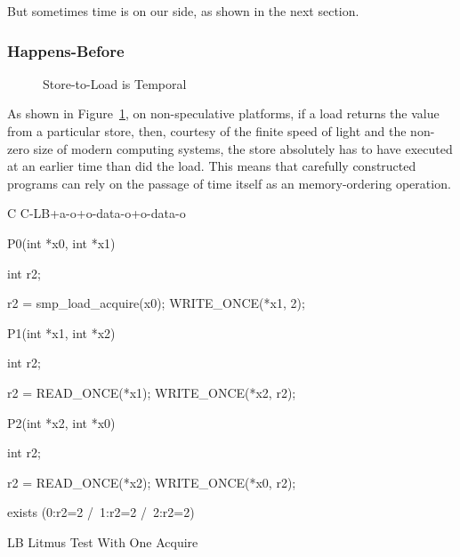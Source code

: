 But sometimes time is on our side, as shown in the next section.

\subsubsection{Happens-Before}
\label{sec:memorder:Happens-Before}

\begin{figure}[tbp]
\centering
{}
\caption{Store-to-Load is Temporal}
\label{fig:memorder:Store-to-Load is Temporal}
\end{figure}

As shown in
Figure~\ref{fig:memorder:Store-to-Load is Temporal},
on non-speculative platforms, if a load returns the value from a
particular store, then, courtesy of the finite speed of light and
the non-zero size of modern computing systems, the store absolutely
has to have executed at an earlier time than did the load.
This means that carefully constructed programs can rely on the
passage of time itself as an memory-ordering operation.

\begin{listing}[tbp]
{ \scriptsize
\begin{verbbox}[\LstLineNo]
C C-LB+a-o+o-data-o+o-data-o
{
}

P0(int *x0, int *x1)
{
  int r2;

  r2 = smp_load_acquire(x0);
  WRITE_ONCE(*x1, 2);
}


P1(int *x1, int *x2)
{
  int r2;

  r2 = READ_ONCE(*x1);
  WRITE_ONCE(*x2, r2);
}

P2(int *x2, int *x0)
{
  int r2;

  r2 = READ_ONCE(*x2);
  WRITE_ONCE(*x0, r2);
}

exists (0:r2=2 /\ 1:r2=2 /\ 2:r2=2)
\end{verbbox}
}
\centering
\theverbbox
\caption{LB Litmus Test With One Acquire}
\label{lst:memorder:LB Litmus Test With One Acquire}
\end{listing}

